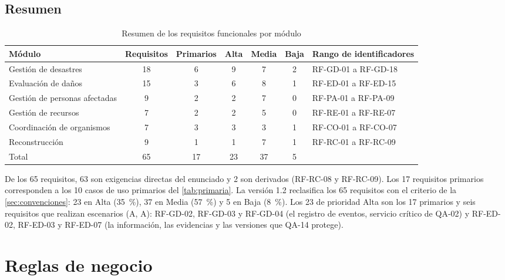 \documentclass[11pt,letterpaper]{article}
\begin{document}
\subsection{Resumen}

\begin{table}[H]
\centering
\caption{Resumen de los requisitos funcionales por módulo}\label{tab:resumen}
\small\setlength{\tabcolsep}{4pt}
\begin{tabular}{lcccccl}
\toprule
\textbf{Módulo} & \textbf{Requisitos} & \textbf{Primarios} & \textbf{Alta} & \textbf{Media} &
\textbf{Baja} & \textbf{Rango de identificadores} \\
\midrule
Gestión de desastres          & 18 & 6 & 9 & 7 & 2 & RF-GD-01 a RF-GD-18 \\
Evaluación de daños           & 15 & 3 & 6 & 8 & 1 & RF-ED-01 a RF-ED-15 \\
Gestión de personas afectadas & 9  & 2 & 2 & 7 & 0 & RF-PA-01 a RF-PA-09 \\
Gestión de recursos           & 7  & 2 & 2 & 5 & 0 & RF-RE-01 a RF-RE-07 \\
Coordinación de organismos    & 7  & 3 & 3 & 3 & 1 & RF-CO-01 a RF-CO-07 \\
Reconstrucción                & 9  & 1 & 1 & 7 & 1 & RF-RC-01 a RF-RC-09 \\
\midrule
Total                         & 65 & 17 & 23 & 37 & 5 & \\
\bottomrule
\end{tabular}
\end{table}

De los 65 requisitos, 63 son exigencias directas del enunciado y 2 son derivados (RF-RC-08 y
RF-RC-09). Los 17 requisitos primarios corresponden a los 10 casos de uso primarios del
\cref{tab:primaria}. La versión 1.2 reclasifica los 65 requisitos con el criterio de la
\cref{sec:convenciones}: 23 en Alta (\qty{35}{\percent}), 37 en Media (\qty{57}{\percent}) y 5 en
Baja (\qty{8}{\percent}). Los 23 de prioridad Alta son los 17 primarios y seis requisitos que realizan
escenarios (A, A): RF-GD-02, RF-GD-03 y RF-GD-04 (el registro de eventos, servicio crítico de QA-02) y
RF-ED-02, RF-ED-03 y RF-ED-07 (la información, las evidencias y las versiones que QA-14 protege).

\newpage
\section{Reglas de negocio}
\label{sec:reglas}
\end{document}
